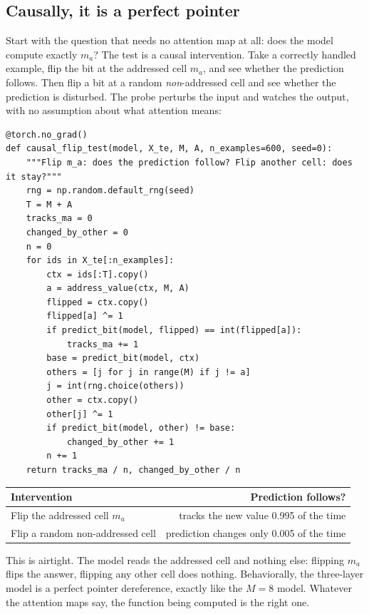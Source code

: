 \subsection*{Causally, it is a perfect pointer}

Start with the question that needs no attention map at all: does the model
compute exactly $m_a$? The test is a causal intervention. Take a correctly
handled example, flip the bit at the addressed cell $m_a$, and see whether the
prediction follows. Then flip a bit at a random \emph{non}-addressed cell and see
whether the prediction is disturbed. The probe perturbs the input and watches the
output, with no assumption about what attention means:

\begin{lstlisting}
@torch.no_grad()
def causal_flip_test(model, X_te, M, A, n_examples=600, seed=0):
    """Flip m_a: does the prediction follow? Flip another cell: does it stay?"""
    rng = np.random.default_rng(seed)
    T = M + A
    tracks_ma = 0
    changed_by_other = 0
    n = 0
    for ids in X_te[:n_examples]:
        ctx = ids[:T].copy()
        a = address_value(ctx, M, A)
        flipped = ctx.copy()
        flipped[a] ^= 1
        if predict_bit(model, flipped) == int(flipped[a]):
            tracks_ma += 1
        base = predict_bit(model, ctx)
        others = [j for j in range(M) if j != a]
        j = int(rng.choice(others))
        other = ctx.copy()
        other[j] ^= 1
        if predict_bit(model, other) != base:
            changed_by_other += 1
        n += 1
    return tracks_ma / n, changed_by_other / n
\end{lstlisting}

\begin{center}
\begin{tabular}{@{}lr@{}}
\toprule
Intervention & Prediction follows? \\
\midrule
Flip the addressed cell $m_a$ & tracks the new value 0.995 of the time \\
Flip a random non-addressed cell & prediction changes only 0.005 of the time \\
\bottomrule
\end{tabular}
\end{center}

This is airtight. The model reads the addressed cell and nothing else: flipping
$m_a$ flips the answer, flipping any other cell does nothing. Behaviorally, the
three-layer model is a perfect pointer dereference, exactly like the $M = 8$
model. Whatever the attention maps say, the function being computed is the right
one.

